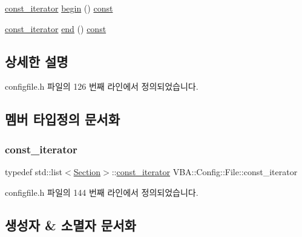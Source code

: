 \begin{DoxyCompactItemize}
\item 
\mbox{\hyperlink{class_v_b_a_1_1_config_1_1_file_a3c4cd2c1e02bbe2dfff43c4e89c71edb}{const\+\_\+iterator}} \mbox{\hyperlink{class_v_b_a_1_1_config_1_1_file_a4dd88e6aa71829ce332139028225efcf}{begin}} () \mbox{\hyperlink{getopt1_8c_a2c212835823e3c54a8ab6d95c652660e}{const}}
\item 
\mbox{\hyperlink{class_v_b_a_1_1_config_1_1_file_a3c4cd2c1e02bbe2dfff43c4e89c71edb}{const\+\_\+iterator}} \mbox{\hyperlink{class_v_b_a_1_1_config_1_1_file_a809724e386bf59c8726c33e822890c70}{end}} () \mbox{\hyperlink{getopt1_8c_a2c212835823e3c54a8ab6d95c652660e}{const}}
\end{DoxyCompactItemize}


\subsection{상세한 설명}


configfile.\+h 파일의 126 번째 라인에서 정의되었습니다.



\subsection{멤버 타입정의 문서화}
\mbox{\label{class_v_b_a_1_1_config_1_1_file_a3c4cd2c1e02bbe2dfff43c4e89c71edb}} 
\subsubsection{\texorpdfstring{const\+\_\+iterator}{const\_iterator}}
{\footnotesize\ttfamily typedef std\+::list$<$\mbox{\hyperlink{class_v_b_a_1_1_config_1_1_section}{Section}}$>$\+::\mbox{\hyperlink{class_v_b_a_1_1_config_1_1_file_a3c4cd2c1e02bbe2dfff43c4e89c71edb}{const\+\_\+iterator}} V\+B\+A\+::\+Config\+::\+File\+::const\+\_\+iterator}



configfile.\+h 파일의 144 번째 라인에서 정의되었습니다.



\subsection{생성자 \& 소멸자 문서화}
\mbox{\label{class_v_b_a_1_1_config_1_1_file_a6ef03ec96b70ff959da2098dc76e3b16}} 
